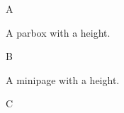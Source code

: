 \documentclass{article}
\begin{document}
A \parbox[t][3cm]{4cm}{A parbox with a height.} B \begin{minipage}[t][2cm]{3cm}A minipage with a height.\end{minipage} C
\end{document}

